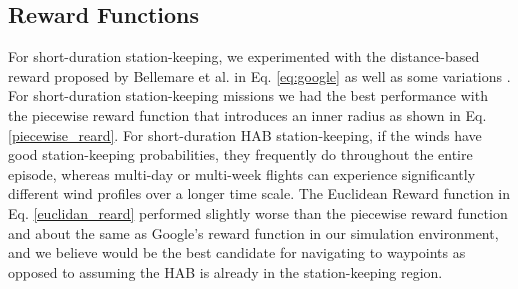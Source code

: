
\subsection{Reward Functions}\label{section:SimEnvforDQN_RewardFunctions}

For short-duration station-keeping, we experimented with the distance-based reward proposed by Bellemare et al. in Eq. \ref{eq:google} as well as some variations \cite{bellemare2020autonomous}. For short-duration station-keeping missions we had the best performance with the piecewise reward function that introduces an inner radius as shown in Eq. \ref{piecewise_reard}.  For short-duration HAB station-keeping, if the winds have good station-keeping probabilities, they frequently do throughout the entire episode, whereas multi-day or multi-week flights can experience significantly different wind profiles over a longer time scale. The Euclidean Reward function in Eq. \ref{euclidan_reard} performed slightly worse than the piecewise reward function and about the same as Google's reward function in our simulation environment, and we believe would be the best candidate for navigating to waypoints as opposed to assuming the HAB is already in the station-keeping region. 

